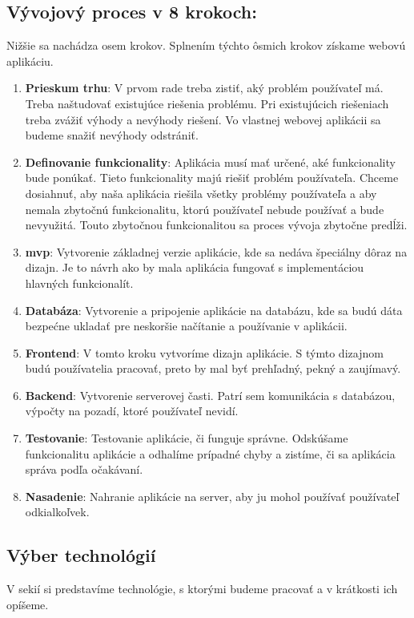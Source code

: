 \subsection{Vývojový proces v 8 krokoch\cite{create_web_app}:}
\indent \indent Nižšie sa nachádza osem krokov. Splnením týchto ôsmich krokov získame webovú aplikáciu.
\begin{enumerate}
    \item \textbf{Prieskum trhu}: V prvom rade treba zistiť, aký problém používateľ má. Treba naštudovať existujúce riešenia problému. Pri existujúcich riešeniach treba zvážiť výhody a nevýhody riešení. Vo vlastnej webovej aplikácii sa budeme snažiť nevýhody odstrániť.
    \item \textbf{Definovanie funkcionality}: Aplikácia musí mať určené, aké funkcionality bude ponúkať. Tieto funkcionality majú riešiť problém používateľa. Chceme dosiahnuť, aby naša aplikácia riešila všetky problémy používateľa a aby nemala zbytočnú funkcionalitu, ktorú používateľ nebude používať a bude nevyužitá. Touto zbytočnou funkcionalitou sa proces vývoja zbytočne predĺži. 
    \item  \textbf{\acrshort{mvp}}: Vytvorenie základnej verzie aplikácie, kde sa nedáva špeciálny dôraz na dizajn. Je to návrh ako by mala aplikácia fungovať s implementáciou hlavných funkcionalít.
    \item \textbf{Databáza}: Vytvorenie a pripojenie aplikácie na databázu, kde sa budú dáta bezpećne ukladať pre neskoršie načítanie a používanie v aplikácii.
    \item \textbf{Frontend}: V tomto kroku vytvoríme dizajn aplikácie. S týmto dizajnom budú používatelia pracovať, preto by mal byť prehľadný, pekný a zaujímavý.
    \item \textbf{Backend}: Vytvorenie serverovej časti. Patrí sem komunikácia s databázou, výpočty na pozadí, ktoré používateľ nevidí.
    \item \textbf{Testovanie}: Testovanie aplikácie, či funguje správne. Odskúšame funkcionalitu aplikácie a odhalíme prípadné chyby a zistíme, či sa aplikácia správa podľa očakávaní.
    \item \textbf{Nasadenie}: Nahranie aplikácie na server, aby ju mohol používať používateľ odkialkoľvek.
\end{enumerate}


\subsection{Výber technológií}
\indent \indent V sekií si predstavíme technológie, s ktorými budeme pracovať a v krátkosti ich opíšeme. 

